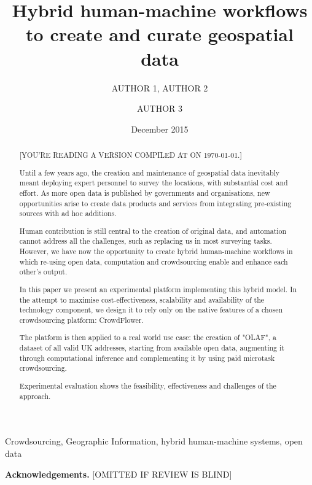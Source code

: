 \documentclass{llncs}
\title{Hybrid human-machine workflows to create and curate geospatial data}
\author{AUTHOR 1\inst{1}, AUTHOR 2\inst{1} \and AUTHOR 3\inst{2}}
\institute{INSTITUTE 1 \email{EMAIL FOR AUTHOR 1} \and INSTITUTE 2}
\date{December 2015}
\begin{document}
\maketitle

\begin{abstract}
[YOU'RE READING A VERSION COMPILED AT \currenttime ON \today.]

Until a few years ago, the creation and maintenance of geospatial data inevitably meant deploying expert personnel to survey the locations, with substantial cost and effort. As more open data is published by governments and organisations, new opportunities arise to create data products and services from integrating pre-existing sources with ad hoc additions.

Human contribution is still central to the creation of original data, and automation cannot address all the challenges, such as replacing us in most surveying tasks. However, we have now the opportunity to create hybrid human-machine workflows in which re-using open data, computation and crowdsourcing enable and enhance each other's output. 

In this paper we present an experimental platform implementing this hybrid model. In the attempt to maximise cost-effectiveness, scalability and availability of the technology component, we design it to rely only on the native features of a chosen crowdsourcing platform: CrowdFlower. 

The platform is then applied to a real world use case: the creation of "OLAF", a dataset of all valid UK addresses, starting from available open data, augmenting it through computational inference and complementing it by using paid microtask crowdsourcing. 

Experimental evaluation shows the feasibility, effectiveness and challenges of the approach.
\end{abstract}

\begin{keywords}
Crowdsourcing, Geographic Information, hybrid human-machine systems, open data 
\end{keywords}









\vspace{5mm}
\textbf{Acknowledgements.} [OMITTED IF REVIEW IS BLIND]


\end{document}
